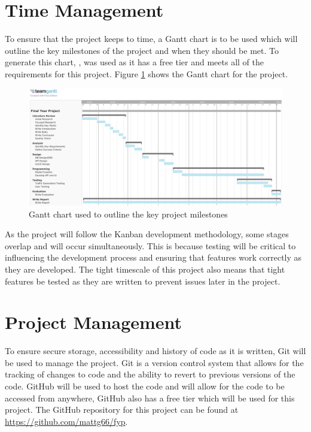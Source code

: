 \section{Time Management}
\label{methodology:time-management}
To ensure that the project keeps to time, a Gantt chart is to be used which will outline the key milestones of the project and when they should be met. To generate this chart, \cite{teamgantt}, was used as it has a free tier and meets all of the requirements for this project. Figure \ref{fig:gantt-chart} shows the Gantt chart for the project.
\begin{figure}[H]
    \centering
    \includegraphics[scale=0.2]{images/gantt-chart.png}
    \caption{Gantt chart used to outline the key project milestones}
    \label{fig:gantt-chart}
\end{figure}
As the project will follow the Kanban development methodology, some stages overlap and will occur simultaneously. This is because testing will be critical to influencing the development process and ensuring that features work correctly as they are developed. The tight timescale of this project also means that tight features be tested as they are written to prevent issues later in the project.
\section{Project Management}
\label{methodology:project-management}
To ensure secure storage, accessibility and history of code as it is written, Git will be used to manage the project. Git is a version control system that allows for the tracking of changes to code and the ability to revert to previous versions of the code. GitHub will be used to host the code and will allow for the code to be accessed from anywhere, GitHub also has a free tier which will be used for this project. The GitHub repository for this project can be found at \url{https://github.com/mattg66/fyp}.